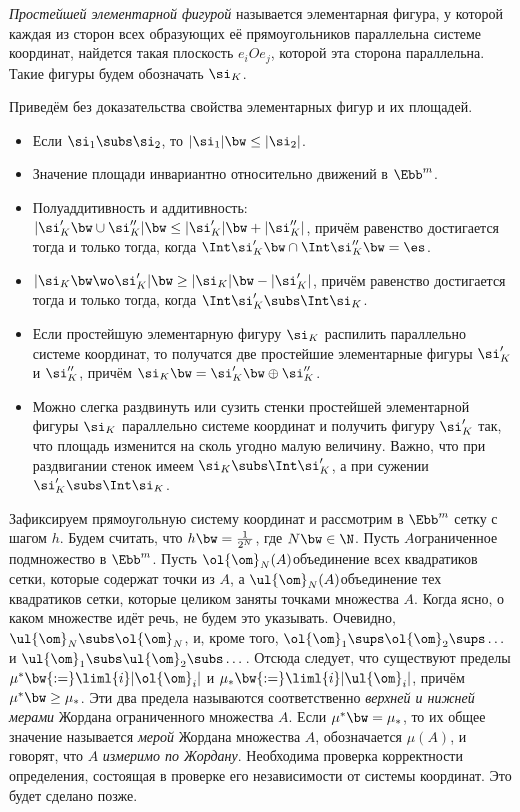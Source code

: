 \documentclass[a4paper]{article}
\begin{document}
\begin{df}
\emph{Простейшей элементарной фигурой} называется элементарная фигура, у которой каждая из сторон
всех образующих её прямоугольников параллельна системе координат,  найдется такая плоскость
$e_iOe_j$, которой эта сторона параллельна. Такие фигуры будем обозначать $\si_K$.
\end{df}

Приведём без доказательства свойства элементарных фигур и их площадей.

\begin{itemize}
\setlength\itemsep{-1mm}
\item Если $\si_1 \subs \si_2$, то $|\si_1|\bw\le |\si_2|$.
\item Значение площади инвариантно относительно движений в $\Ebb^m$.
\item Полуаддитивность и аддитивность: $|\si_K' \bw\cup \si_K''| \bw\le |\si_K'| \bw+ |\si_K''|$,
причём равенство достигается тогда и только тогда, когда $\Int \si_K' \bw\cap \Int \si_K'' \bw= \es$.
\item $|\si_K \bw\wo \si_K'| \bw\ge |\si_K|\bw- |\si_K'|$, причём равенство достигается тогда и только тогда,
когда $\Int \si_K' \subs \Int \si_K$.
\item Если простейшую элементарную фигуру $\si_K$ распилить параллельно системе координат, то
получатся две простейшие элементарные фигуры $\si_K'$ и $\si_K''$, причём
$\si_K\bw=\si_K'\bw\oplus\si_K''$.
\item Можно слегка раздвинуть или сузить стенки простейшей элементарной фигуры $\si_K$ параллельно
системе координат и получить фигуру $\si_K'$ так, что площадь изменится на сколь угодно малую
величину. Важно, что при раздвигании стенок имеем $\si_K \subs \Int \si_K'$, а при сужении $\si_K'
\subs \Int \si_K$.
\end{itemize}

\begin{df}
Зафиксируем прямоугольную систему координат и рассмотрим в $\Ebb^m$ сетку с шагом $h$. Будем
считать, что $h\bw=\frac{1}{2^N}$, где $N \bw\in \N$. Пусть $A$\т ограниченное подмножество в $\Ebb^m$.
Пусть $\ol{\om}_N(A)$\т объединение всех квадратиков сетки, которые содержат точки из $A$, а
$\ul{\om}_N(A)$\т объединение тех квадратиков сетки, которые целиком заняты точками множества $A$.
Когда ясно, о каком множестве идёт речь, не будем это указывать. Очевидно, $\ul{\om}_N \subs
\ol{\om}_N$, и, кроме того, $\ol{\om}_1 \sups \ol{\om}_2 \sups \dots$ и $\ul{\om}_1 \subs
\ul{\om}_2 \subs \dots$. Отсюда следует, что существуют пределы $\mu^* \bw{:=}
\liml{i}|\ol{\om}_i|$ и $\mu_* \bw{:=} \liml{i}|\ul{\om}_i|$, причём $\mu^* \bw\ge \mu_*$. Эти два
предела называются соответственно \emph{верхней и нижней мерами} Жордана ограниченного множества
$A$. Если $\mu^*\bw=\mu_*$, то их общее значение называется \emph{мерой} Жордана множества $A$,
обозначается $\mu(A)$, и говорят, что $A$ \emph{измеримо по Жордану}. Необходима проверка
корректности определения, состоящая в проверке его независимости от системы координат. Это будет
сделано позже.
\end{df}
\end{document}
